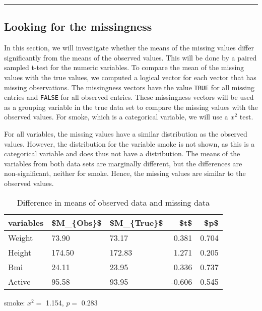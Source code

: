 \documentclass[
]{article}
\begin{document}
\begin{center}\rule{0.5\linewidth}{0.5pt}\end{center}

\hypertarget{looking-for-the-missingness}{%
\subsection{Looking for the missingness}\label{looking-for-the-missingness}}

In this section, we will investigate whether the means of the missing values differ significantly from the means of the observed values. This will be done by a paired sampled t-test for the numeric variables. To compare the mean of the missing values with the true values, we computed a logical vector for each vector that has missing observations. The missingness vectors have the value \texttt{TRUE} for all missing entries and \texttt{FALSE} for all observed entries. These missingness vectors will be used as a grouping variable in the true data set to compare the missing values with the observed values.
For smoke, which is a categorical variable, we will use a \(x^2\) test.

For all variables, the missing values have a similar distribution as the observed values. However, the distribution for the variable smoke is not shown, as this is a categorical variable and does thus not have a distribution. The means of the variables from both data sets are marginally different, but the differences are non-significant, neither for smoke. Hence, the missing values are similar to the observed values.

\begin{table}

\caption{\label{tab:mnar-t}Difference in means of observed data and missing data}
\centering
\begin{tabular}[t]{l|l|l|r|r}
\hline
variables & \$M\_\{Obs\}\$ & \$M\_\{True\}\$ & \$t\$ & \$p\$\\
\hline
Weight & 73.90 & 73.17 & 0.381 & 0.704\\
\hline
Height & 174.50 & 172.83 & 1.271 & 0.205\\
\hline
Bmi & 24.11 & 23.95 & 0.336 & 0.737\\
\hline
Active & 95.58 & 93.95 & -0.606 & 0.545\\
\hline
\end{tabular}
\end{table}

smoke: \(x^2 =\) 1.154, \(p =\) 0.283
\end{document}
